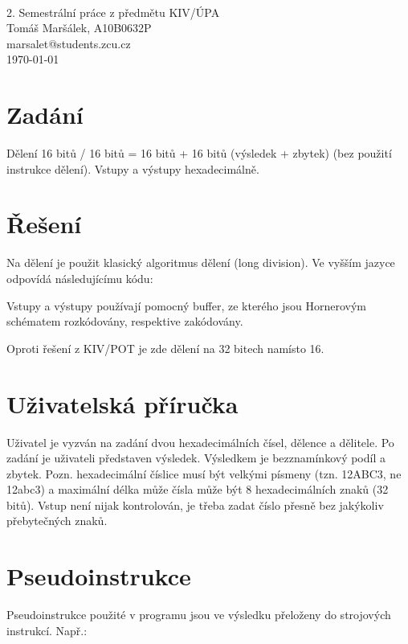 \documentclass[titlepage]{article}
\begin{document}
\lstset{language=[mips]Assembler,
		basicstyle=\small\sffamily,
		numbers=left,
		numberstyle=\tiny,
		frame=tb}
\begin{titlepage}
\begin{center}
	\mbox{} \\[3cm]
	\huge{2. Semestrální práce z předmětu KIV/ÚPA} \\[2.5cm]
	\Large{Tomáš Maršálek, A10B0632P} \\
	\large{marsalet@students.zcu.cz} \\[1cm]
	\normalsize{\today}
\end{center}
\thispagestyle{empty}
\end{titlepage}

\section{Zadání}
Dělení 16 bitů / 16 bitů = 16 bitů + 16 bitů (výsledek + zbytek) (bez použití
instrukce dělení). Vstupy a výstupy hexadecimálně.

\section{Řešení}
Na dělení je použit klasický algoritmus dělení (long division). Ve vyšším
jazyce odpovídá následujícímu kódu:


Vstupy a výstupy používají pomocný buffer, ze kterého jsou Hornerovým schématem
rozkódovány, respektive zakódovány.

Oproti řešení z KIV/POT je zde dělení na 32 bitech namísto 16.

\section{Uživatelská příručka}
Uživatel je vyzván na zadání dvou hexadecimálních čísel, dělence a dělitele. Po
zadání je uživateli představen výsledek.  Výsledkem je bezznamínkový podíl a
zbytek. Pozn. hexadecimální číslice musí být velkými písmeny (tzn. 12ABC3, ne
12abc3) a maximální délka může čísla může být 8 hexadecimálních znaků (32
bitů). Vstup není nijak kontrolován, je třeba zadat číslo přesně bez jakýkoliv
přebytečných znaků.

\section{Pseudoinstrukce}
Pseudoinstrukce použité v programu jsou ve výsledku přeloženy do
strojových instrukcí. Např.:
\\[.3cm]
\end{document}

